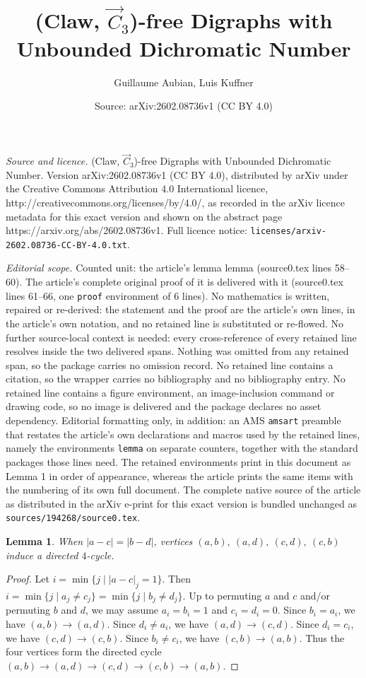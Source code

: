\documentclass[10pt,a4paper]{amsart}
\title{(Claw, $\vec C_3$)-free Digraphs with Unbounded Dichromatic Number}
\author{Guillaume Aubian, Luis Kuffner}
\date{Source: arXiv:2602.08736v1 (CC BY 4.0)}
\newtheorem{lemma}{Lemma}
\begin{document}
\maketitle

\noindent\emph{Source and licence.} (Claw, $\vec C_3$)-free Digraphs with Unbounded Dichromatic Number. Version arXiv:2602.08736v1 (CC BY 4.0), distributed by arXiv under the Creative Commons Attribution 4.0 International licence, http://creativecommons.org/licenses/by/4.0/, as recorded in the arXiv licence metadata for this exact version and shown on the abstract page https://arxiv.org/abs/2602.08736v1. Full licence notice: \texttt{licenses/arxiv-2602.08736-CC-BY-4.0.txt}.\par\smallskip

\noindent\textit{Editorial scope.} Counted unit: the article's lemma lemma (source0.tex lines 58--60). The article's complete original proof of it is delivered with it (source0.tex lines 61--66, one \texttt{proof} environment of 6 lines). No mathematics is written, repaired or re-derived: the statement and the proof are the article's own lines, in the article's own notation, and no retained line is substituted or re-flowed.  No further source-local context is needed: every cross-reference of every retained line resolves inside the two delivered spans.  Nothing was omitted from any retained span, so the package carries no omission record.  No retained line contains a citation, so the wrapper carries no bibliography and no bibliography entry.  No retained line contains a figure environment, an image-inclusion command or drawing code, so no image is delivered and the package declares no asset dependency.  Editorial formatting only, in addition: an AMS \texttt{amsart} preamble that restates the article's own declarations and macros used by the retained lines, namely the environments \texttt{lemma} on separate counters, together with the standard packages those lines need.  The retained environments print in this document as Lemma 1 in order of appearance, whereas the article prints the same items with the numbering of its own full document.  The complete native source of the article as distributed in the arXiv e-print for this exact version is bundled unchanged as \texttt{sources/194268/source0.tex}.
\begin{lemma}
When $|a - c| = |b - d|$, vertices $(a,b),\ (a,d),\ (c,d),\ (c,b)$ induce a directed $4$-cycle.
\end{lemma}

\begin{proof}
Let $i=\min \{j \mid |a - c|_{j}  = 1\}$. Then $i = \min\{j \mid a_j \ne c_j\} = \min\{j \mid b_j \ne d_j\}$.
Up to permuting $a$ and $c$ and/or permuting $b$ and $d$, we may assume $a_i = b_i = 1$ and $c_i = d_i = 0$.
Since $b_i = a_i$, we have $(a,b) \to (a,d)$. Since $d_i \ne a_i$, we have $(a,d) \to (c,d)$. Since $d_i = c_i$, we have $(c,d) \to (c,b)$. Since $b_i \ne c_i$, we have $(c,b) \to (a,b)$.
Thus the four vertices form the directed cycle $(a,b) \to (a,d) \to (c,d) \to (c,b) \to (a,b)$.
\end{proof}
\end{document}
